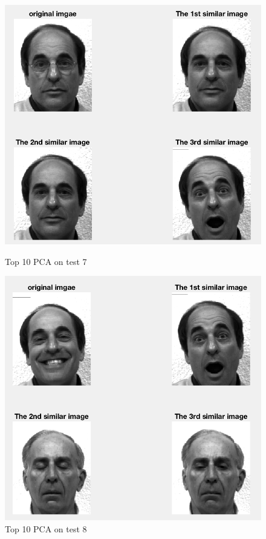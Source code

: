 \documentclass{article}
\begin{document}
\begin{figure}[htbp]
\centering
\begin{minipage}[t]{0.48\textwidth}
\centering
\includegraphics[scale = 0.3]{10_7.png}
\caption{Top 10 PCA on test 7}
\end{minipage}
\begin{minipage}[t]{0.48\textwidth}
\centering
\includegraphics[scale = 0.3]{10_8.png}
\caption{Top 10 PCA on test 8}
\end{minipage}
\end{figure}
\end{document}
